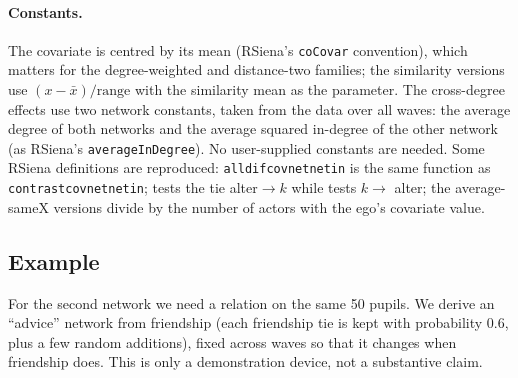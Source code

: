 \paragraph{Constants.} The covariate is centred by its mean (RSiena's \texttt{coCovar} convention), which matters for the degree-weighted and distance-two families; the similarity versions use $(x-\bar x)/\text{range}$ with the similarity mean as the parameter. The cross-degree effects use two network constants, taken from the data over all waves: the average degree of both networks and the average squared in-degree of the other network (as RSiena's \texttt{averageInDegree}). No user-supplied constants are needed. Some RSiena definitions are reproduced: \texttt{alldifcovnetnetin} is the same function as \texttt{contrastcovnetnetin};  tests the tie alter$\to$$k$ while  tests $k\to$ alter; the average-sameX versions divide by the number of actors with the ego's covariate value.

\subsection{Example}

For the second network we need a relation on the same 50 pupils. We derive an ``advice'' network from friendship (each friendship tie is kept with probability 0.6, plus a few random additions), fixed across waves so that it changes when friendship does. This is only a demonstration device, not a substantive claim.

